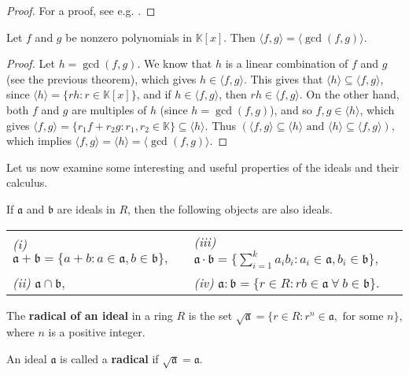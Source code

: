 \documentclass[english,bachelor]{liumaiex}
\begin{document}
\begin{proof}
For a proof, see e.g. \cite[pp. 12-13]{froberg}.
\end{proof}

\begin{thm}
Let $f$ and $g$ be nonzero polynomials in $\mathbb{K}[x].$ Then $\langle f,g \rangle=\langle \gcd(f,g)\rangle$.
\end{thm}

\begin{proof}
Let $h=\gcd(f,g)$. We know that $h$ is a linear combination of $f$ and $g$ (see the previous theorem), which gives $h \in \langle f,g \rangle.$ This gives that $\langle h \rangle \subseteq \langle f,g \rangle$, since $\langle h \rangle = \{rh : r\in \mathbb{K}[x]\}$, and if $h\in \langle f,g \rangle$, then $rh \in \langle f,g \rangle.$ On the other hand, both $f$ and $g$ are multiples of $h$ (since $h=\gcd(f,g)$), and so $f,g \in \langle h \rangle$, which gives $\langle f,g \rangle = \{r_1f+r_2g : r_1,r_2 \in \mathbb{K}\} \subseteq \langle h \rangle.$ Thus $\left(\langle f,g \rangle \subseteq \langle h \rangle \textrm{ and } \langle h \rangle \subseteq \langle f,g \rangle \right)$, which implies $\langle f,g \rangle = \langle h \rangle = \langle \gcd(f,g) \rangle.$
\end{proof}

Let us now examine some interesting and useful properties of the ideals and their calculus.
\begin{thm}
If $\mathfrak{a}$ and $\mathfrak{b}$ are ideals in $R$, then the following objects are also ideals.
\begin{tabular}{l p{6.5cm}}
\emph{(i)} $\mathfrak{a}+\mathfrak{b}=\{a+b : a\in \mathfrak{a}, b\in \mathfrak{b}\},$ & \emph{(iii)} $\mathfrak{a}\cdot\mathfrak{b}=\{\sum_{i=1}^{k}a_ib_i : a_i\in\mathfrak{a}, b_i\in\mathfrak{b}\},$ \\
\emph{(ii)} $\mathfrak{a}\cap\mathfrak{b},$ & \emph{(iv)} $\mathfrak{a}:\mathfrak{b} = \{r\in R : rb\in\mathfrak{a} \ \forall \ b\in\mathfrak{b}\}.$
\end{tabular}
\end{thm}

\begin{define}
The \textbf{radical of an ideal} in a ring $R$ is the set $\sqrt{\mathfrak{a}}=\{r\in R : r^n \in \mathfrak{a}, \textrm{ for some } n \}$, where $n$ is a positive integer.
\end{define}

\begin{define}
An ideal $\mathfrak{a}$ is called a \textbf{radical} if $\sqrt{\mathfrak{a}} = \mathfrak{a}$.
\end{define}
\end{document}
